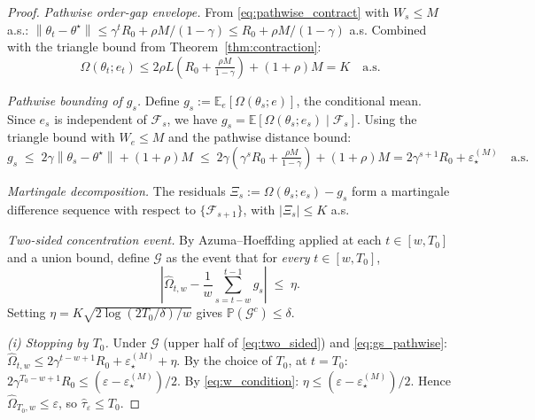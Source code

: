 \documentclass[10pt,a4paper]{amsart}
\newcommand{\Ogap}{\Omega}
\newcommand{\norm}[1]{\left\lVert#1\right\rVert}
\begin{document}
\begin{proof}
\emph{Pathwise order-gap envelope.}
From \eqref{eq:pathwise_contract} with $W_s \leq M$ a.s.:
$\norm{\theta_t - \theta^\star} \leq \gamma^t R_0 + \rho M/(1-\gamma) \leq
R_0 + \rho M/(1-\gamma)$ a.s. Combined with the triangle bound from
Theorem~\ref{thm:contraction}:
\[
  \Ogap(\theta_t; e_t) \leq 2\rho L\!\left(R_0 + \tfrac{\rho M}{1-\gamma}\right) + (1+\rho) M
  = K \quad\text{a.s.}
\]

\emph{Pathwise bounding of $g_s$.}
Define $g_s := \mathbb{E}_e[\Ogap(\theta_s; e)]$, the conditional mean.
Since $e_s$ is independent of $\mathcal{F}_s$, we have
$g_s = \mathbb{E}[\Ogap(\theta_s; e_s) \mid \mathcal{F}_s]$.
Using the triangle bound with $W_e \leq M$ and the pathwise distance bound:
\begin{equation}
\label{eq:gs_pathwise}
g_s \;\leq\; 2\gamma \norm{\theta_s - \theta^\star} + (1+\rho)M
\;\leq\; 2\gamma(\gamma^s R_0 + \tfrac{\rho M}{1-\gamma}) + (1+\rho)M
= 2\gamma^{s+1} R_0 + \varepsilon_\star^{(M)} \quad\text{a.s.}
\end{equation}

\emph{Martingale decomposition.}
The residuals $\Xi_s := \Ogap(\theta_s; e_s) - g_s$ form a martingale
difference sequence with respect to $\{\mathcal{F}_{s+1}\}$, with
$|\Xi_s| \leq K$ a.s.

\emph{Two-sided concentration event.}
By Azuma--Hoeffding applied at each $t \in [w, T_0]$ and a union bound,
define $\mathcal{G}$ as the event that for \emph{every} $t \in [w, T_0]$,
\begin{equation}
\label{eq:two_sided}
\left|\widehat{\Ogap}_{t,w} - \frac{1}{w}\sum_{s=t-w}^{t-1} g_s\right|
\;\leq\; \eta.
\end{equation}
Setting $\eta = K\sqrt{2 \log(2 T_0 / \delta) / w}$ gives
$\mathbb{P}(\mathcal{G}^c) \leq \delta$.

\emph{(i) Stopping by $T_0$.}
Under $\mathcal{G}$ (upper half of \eqref{eq:two_sided}) and \eqref{eq:gs_pathwise}:
$\widehat{\Ogap}_{t,w} \leq 2\gamma^{t-w+1} R_0 + \varepsilon_\star^{(M)} + \eta$.
By the choice of $T_0$, at $t = T_0$:
$2\gamma^{T_0-w+1} R_0 \leq (\varepsilon - \varepsilon_\star^{(M)})/2$.
By \eqref{eq:w_condition}: $\eta \leq (\varepsilon - \varepsilon_\star^{(M)})/2$.
Hence $\widehat{\Ogap}_{T_0, w} \leq \varepsilon$, so $\hat\tau_\varepsilon \leq T_0$.


\end{proof}
\end{document}
